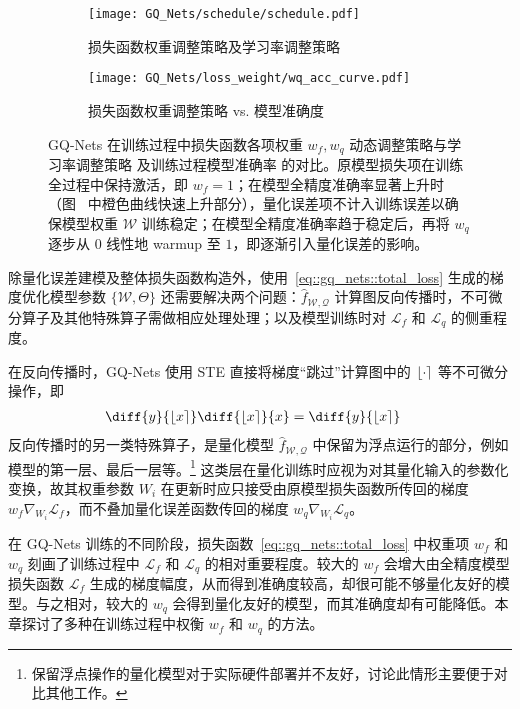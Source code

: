 \begin{figure}[htb]
  \centering
  \begin{subfigure}[t]{0.45\columnwidth}
    \centering
    \texttt{[image: GQ\_Nets/schedule/schedule.pdf]}
    \caption{损失函数权重调整策略及学习率调整策略}
    \label{img::gq_nets::w_fq_schedule}
  \end{subfigure}
  \quad
  \begin{subfigure}[t]{0.45\columnwidth}
    \centering
    \texttt{[image: GQ\_Nets/loss\_weight/wq\_acc\_curve.pdf]}
    \caption{损失函数权重调整策略 vs. 模型准确度}
    \label{img::gq_nets::schedule_acc}
  \end{subfigure}
  \caption{GQ-Nets 在训练过程中损失函数各项权重 $w_f, w_q$ 动态调整策略与学习率调整策略  及训练过程模型准确率  的对比。原模型损失项在训练全过程中保持激活，即 $w_f = 1$；在模型全精度准确率显著上升时（图~ 中橙色曲线快速上升部分），量化误差项不计入训练误差以确保模型权重 $\mathcal{W}$ 训练稳定；在模型全精度准确率趋于稳定后，再将 $w_q$ 逐步从 $0$ 线性地 warmup 至 $1$，即逐渐引入量化误差的影响。}
  \label{img::gq_nets::schedule}
\end{figure}

除量化误差建模及整体损失函数构造外，使用~\eqref{eq::gq_nets::total_loss} 生成的梯度优化模型参数 $\{\mathcal{W}, \Theta\}$ 还需要解决两个问题：$\hat{f}_{\mathcal{W, Q}}$ 计算图反向传播时，不可微分算子及其他特殊算子需做相应处理处理；以及模型训练时对 $\mathcal{L}_f$ 和 $\mathcal{L}_q$ 的侧重程度。

在反向传播时，GQ-Nets 使用 STE 直接将梯度“跳过”计算图中的 $\left\lfloor \cdot \right\rceil$ 等不可微分操作，即
\begin{align}
  \diff{y}{\Round{x}} \diff{\Round{x}}{x} &= \diff{y}{\Round{x}}
\end{align}
反向传播时的另一类特殊算子，是量化模型 $\hat{f}_{\mathcal{W, Q}}$ 中保留为浮点运行的部分，例如模型的第一层、最后一层等。\footnote{保留浮点操作的量化模型对于实际硬件部署并不友好，讨论此情形主要便于对比其他工作。} 这类层在量化训练时应视为对其量化输入的参数化变换，故其权重参数 $W_i$ 在更新时应只接受由原模型损失函数所传回的梯度 $w_f \nabla_{W_i}\mathcal{L}_f$，而不叠加量化误差函数传回的梯度 $w_q \nabla_{W_i}\mathcal{L}_q$。%

在 GQ-Nets 训练的不同阶段，损失函数~\eqref{eq::gq_nets::total_loss} 中权重项 $w_f$ 和 $w_q$ 刻画了训练过程中 $\mathcal{L}_f$ 和 $\mathcal{L}_q$ 的相对重要程度。较大的 $w_f$ 会增大由全精度模型损失函数 $\mathcal{L}_f$ 生成的梯度幅度，从而得到准确度较高，却很可能不够量化友好的模型。与之相对，较大的 $w_q$ 会得到量化友好的模型，而其准确度却有可能降低。本章探讨了多种在训练过程中权衡 $w_f$ 和 $w_q$ 的方法。

